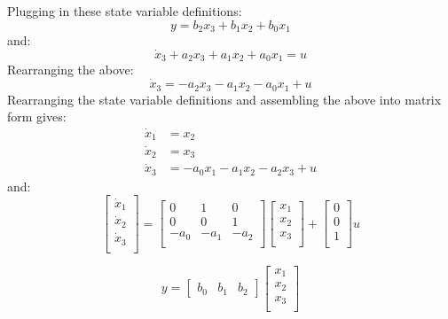 Plugging in these state variable definitions:
\begin{equation*}
  y=b_2x_3+b_1x_2+b_0x_1
\end{equation*}
and:
\begin{equation*}
  \dot{x}_3+a_2x_3+a_1x_2+a_0x_1=u
\end{equation*}
Rearranging the above:
\begin{equation*}
  \dot{x}_3=-a_2x_3-a_1x_2-a_0x_1+u
\end{equation*}
Rearranging the state variable definitions and assembling the above into matrix form gives:
\begin{equation*}
  \begin{split}
    \dot{x}_1&=x_2 \\
    \dot{x}_2&=x_3 \\
    \dot{x}_3&=-a_0x_1-a_1x_2-a_2x_3+u
  \end{split}
\end{equation*}
and:
\begin{equation*}
  \begin{bmatrix}
    \dot{x}_1 \\ %
    \dot{x}_2 \\
    \dot{x}_3 \\
  \end{bmatrix}=
  \begin{bmatrix}
    0 & 1 & 0 \\ %
    0 & 0 & 1 \\
    -a_0 & -a_1 & -a_2 \\
  \end{bmatrix}
  \begin{bmatrix}
    x_1 \\ %
    x_2 \\
    x_3 \\
  \end{bmatrix}+
  \begin{bmatrix}
    0 \\ %
    0 \\
    1 \\
  \end{bmatrix}u
\end{equation*}

\begin{equation*}
  y=
  \begin{bmatrix}
    b_0 & b_1 & b_2
  \end{bmatrix}
  \begin{bmatrix}
    x_1 \\ %
    x_2 \\
    x_3 \\
  \end{bmatrix}
\end{equation*}


